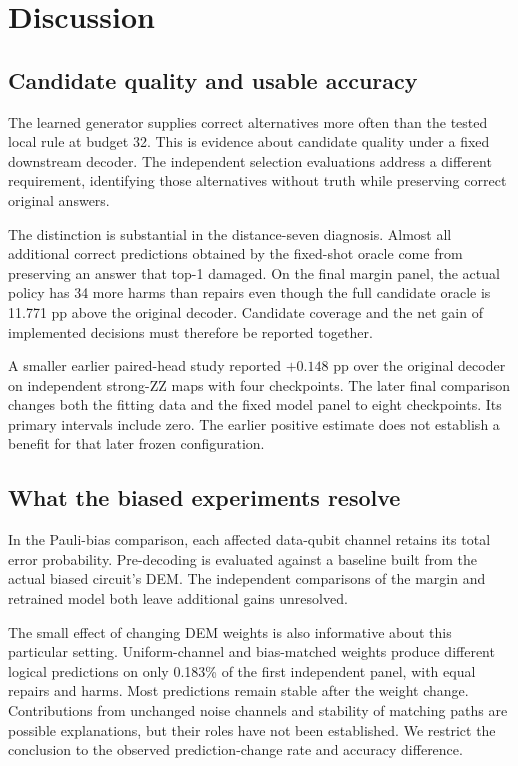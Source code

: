 \documentclass[aps,prd,12pt,twocolumn,superscriptaddress,floatfix]{revtex4-2}
\begin{document}
\section{Discussion}

\subsection{Candidate quality and usable accuracy}

The learned generator supplies correct alternatives more often than the tested local rule at budget 32. This is evidence about candidate quality under a fixed downstream decoder. The independent selection evaluations address a different requirement, identifying those alternatives without truth while preserving correct original answers.

The distinction is substantial in the distance-seven diagnosis. Almost all additional correct predictions obtained by the fixed-shot oracle come from preserving an answer that top-1 damaged. On the final margin panel, the actual policy has 34 more harms than repairs even though the full candidate oracle is 11.771 pp above the original decoder. Candidate coverage and the net gain of implemented decisions must therefore be reported together.

A smaller earlier paired-head study reported \(+0.148\) pp over the original decoder on independent strong-ZZ maps with four checkpoints. The later final comparison changes both the fitting data and the fixed model panel to eight checkpoints. Its primary intervals include zero. The earlier positive estimate does not establish a benefit for that later frozen configuration.

\subsection{What the biased experiments resolve}

In the Pauli-bias comparison, each affected data-qubit channel retains its total error probability. Pre-decoding is evaluated against a baseline built from the actual biased circuit's DEM. The independent comparisons of the margin and retrained model both leave additional gains unresolved.

The small effect of changing DEM weights is also informative about this particular setting. Uniform-channel and bias-matched weights produce different logical predictions on only 0.183\% of the first independent panel, with equal repairs and harms. Most predictions remain stable after the weight change. Contributions from unchanged noise channels and stability of matching paths are possible explanations, but their roles have not been established. We restrict the conclusion to the observed prediction-change rate and accuracy difference.
\end{document}
